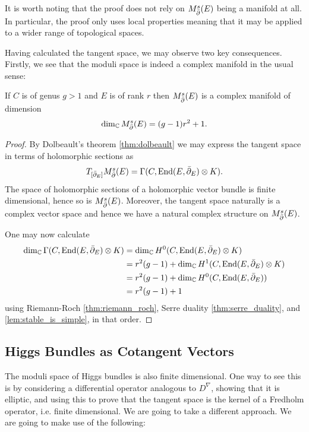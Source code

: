 \documentclass[12pt]{ociamthesis}  %
\begin{document}
It is worth noting that the proof does not rely on $M^s_{\bar{\partial}}(E)$ being a manifold
at all. In particular, the proof only uses local properties meaning
that it may be applied to a wider range of topological spaces.

Having calculated the tangent space, we may observe two key consequences.
Firstly, we see that the moduli space is indeed a complex manifold in the usual sense:

\begin{corollary}
  If $C$ is of genus $g>1$ and $E$ is of rank $r$ then
  $M^s_{\bar{\partial}}(E)$ is a complex manifold of dimension
  \begin{align*}
    \dim_{\mathbb{C}} M^s_{\bar{\partial}}(E) = (g-1)r^2 + 1.
  \end{align*}
  \begin{proof}
    By Dolbeault's theorem \ref{thm:dolbeault} we may express the tangent space in terms of holomorphic
    sections as
    \begin{align*}
      T_{[{\bar{\partial}}_E]}M^s_{\bar{\partial}}(E) = \Gamma(C,\operatorname{End}(E,{\bar{\partial}}_E) \otimes K).
    \end{align*}
    The space of holomorphic sections of a holomorphic vector bundle is finite dimensional,
    hence so is $M^s_{\bar{\partial}}(E)$. Moreover, the tangent space naturally is a complex vector
    space and hence we have a natural complex structure on $M^s_{\bar{\partial}}(E)$.

    One may now calculate
    \begin{align*}
      \dim_{\mathbb C} \Gamma(C,\operatorname{End}(E,{\bar{\partial}}_E)\otimes K)
       & = \dim_{\mathbb C} H^0(C,\operatorname{End}(E,{\bar{\partial}}_E)\otimes K)          \\
       & = r^2(g-1)+\dim_{\mathbb C} H^1(C,\operatorname{End}(E,{\bar{\partial}}_E)\otimes K) \\
       & = r^2(g-1)+\dim_{\mathbb C} H^0(C,\operatorname{End}(E,{\bar{\partial}}_E))          \\
       & = r^2(g-1)+1
    \end{align*}
    using Riemann-Roch \ref{thm:riemann_roch},
    Serre duality \ref{thm:serre_duality}, and \ref{lem:stable_is_simple},
    in that order.
  \end{proof}
\end{corollary}

\subsection{Higgs Bundles as Cotangent Vectors}

The moduli space of Higgs bundles is also finite dimensional. One way to
see this is by considering a differential operator analogous to $D^\nabla$,
showing that it is elliptic, and using this to prove that the
tangent space is the kernel of a Fredholm operator, i.e. finite
dimensional. We are going to take a different approach.
We are going to make use of the following:
\end{document}
